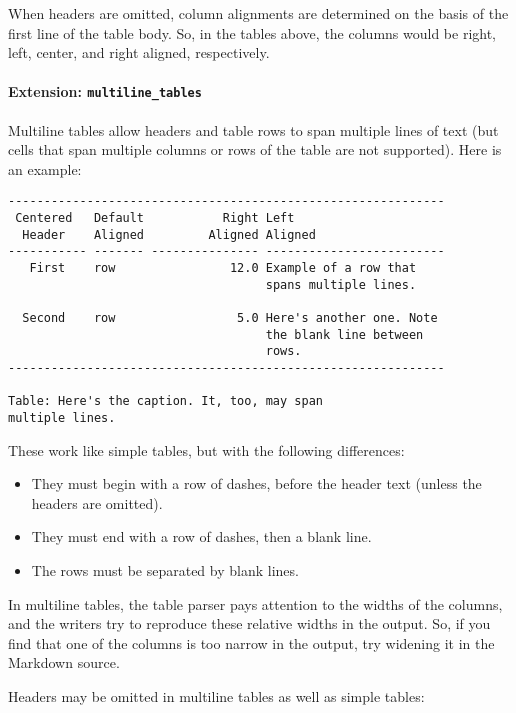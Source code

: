 \documentclass[]{article}
\providecommand{\tightlist}{%
  \setlength{\itemsep}{0pt}\setlength{\parskip}{0pt}}
\let\oldparagraph\paragraph
\renewcommand{\paragraph}[1]{\oldparagraph{#1}\mbox{}}
\begin{document}
When headers are omitted, column alignments are determined on the basis
of the first line of the table body. So, in the tables above, the
columns would be right, left, center, and right aligned, respectively.

\paragraph{\texorpdfstring{Extension:
\texttt{multiline\_tables}}{Extension: multiline\_tables}}\label{extension-multiline_tables}

Multiline tables allow headers and table rows to span multiple lines of
text (but cells that span multiple columns or rows of the table are not
supported). Here is an example:

\begin{verbatim}
-------------------------------------------------------------
 Centered   Default           Right Left
  Header    Aligned         Aligned Aligned
----------- ------- --------------- -------------------------
   First    row                12.0 Example of a row that
                                    spans multiple lines.

  Second    row                 5.0 Here's another one. Note
                                    the blank line between
                                    rows.
-------------------------------------------------------------

Table: Here's the caption. It, too, may span
multiple lines.
\end{verbatim}

These work like simple tables, but with the following differences:

\begin{itemize}
\tightlist
\item
  They must begin with a row of dashes, before the header text (unless
  the headers are omitted).
\item
  They must end with a row of dashes, then a blank line.
\item
  The rows must be separated by blank lines.
\end{itemize}

In multiline tables, the table parser pays attention to the widths of
the columns, and the writers try to reproduce these relative widths in
the output. So, if you find that one of the columns is too narrow in the
output, try widening it in the Markdown source.

Headers may be omitted in multiline tables as well as simple tables:
\end{document}

